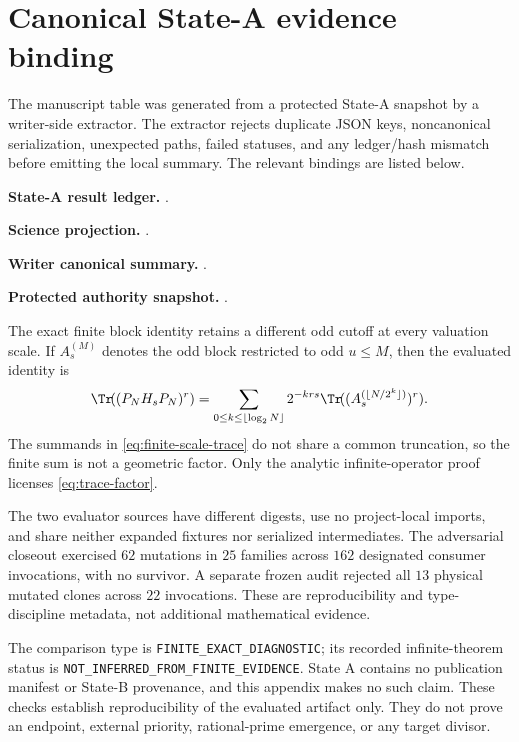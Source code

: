 \section{Canonical State-A evidence binding}
\label{app:evidence}

The manuscript table was generated from a protected State-A snapshot by a
writer-side extractor.  The extractor rejects duplicate JSON keys,
noncanonical serialization, unexpected paths, failed statuses, and any
ledger/hash mismatch before emitting the local summary.  The relevant
bindings are listed below.

\noindent\textbf{State-A result ledger.}\quad
\texttt{}.

\noindent\textbf{Science projection.}\quad
\texttt{}.

\noindent\textbf{Writer canonical summary.}\quad
\texttt{}.

\noindent\textbf{Protected authority snapshot.}\quad
\texttt{}.

The exact finite block identity retains a different odd cutoff at every
valuation scale.  If $A_s^{(M)}$ denotes the odd block restricted to odd
$u\le M$, then the evaluated identity is
\begin{equation}
  \Tr\!((P_NH_sP_N)^r)
  =\sum_{0\le k\le\lfloor\log_2N\rfloor}
    2^{-krs}
    \Tr\!(
      (A_s^{(\lfloor N/2^k\rfloor)})^r
    ).
  \label{eq:finite-scale-trace}
\end{equation}
The summands in \cref{eq:finite-scale-trace} do not share a common
truncation, so the finite sum is not a geometric factor.  Only the analytic
infinite-operator proof licenses \cref{eq:trace-factor}.

The two evaluator sources have different digests, use no project-local
imports, and share neither expanded fixtures nor serialized intermediates.
The adversarial closeout exercised $62$ mutations in $25$ families across
$162$ designated consumer invocations, with no survivor.  A separate frozen
audit rejected all $13$ physical mutated clones across $22$ invocations.
These are reproducibility and type-discipline metadata, not additional
mathematical evidence.

The comparison type is \texttt{FINITE\_EXACT\_DIAGNOSTIC}; its recorded
infinite-theorem status is
\texttt{NOT\_INFERRED\_FROM\_FINITE\_EVIDENCE}.  State A contains no
publication manifest or State-B provenance, and this appendix makes no such
claim.  These checks establish reproducibility of the evaluated artifact
only.  They do not prove an endpoint, external priority, rational-prime
emergence, or any target divisor.
